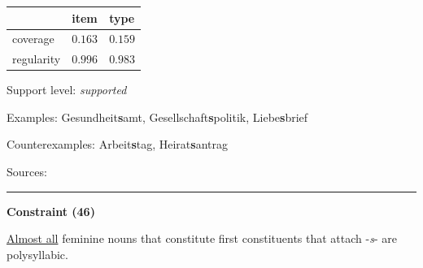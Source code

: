 \vspace{-0.35em}

\begin{table}[!ht]
\begin{center}

\begin{tabularx}{\columnwidth}{|X|X|X|}
\hline
 & item & type \\
\hline
 coverage & $0.163$ & $0.159$ \\
\hline
 regularity & $0.996$ & $0.983$ \\
\hline
\end{tabularx}
\end{center}
\end{table}

\vspace{-1.35em}

\noindent
Support level: \textit{supported}

\vspace{0.3em}

\noindent
Examples: Gesundheit\textbf{s}amt, Gesellschaft\textbf{s}politik, Liebe\textbf{s}brief

\noindent
Counterexamples: Arbeit\textbf{s}tag, Heirat\textbf{s}antrag

\vspace{0.3em}

\noindent
Sources: \citet[23, 24]{kuerschner_2010}


\hrule




\vspace{0.4em}

\begin{center}
\textbf{Constraint (46)}
\end{center}

\noindent
\underline{Almost all} feminine nouns that constitute first constituents that attach -\textit{s}- are polysyllabic.
\vspace{0.35em}


